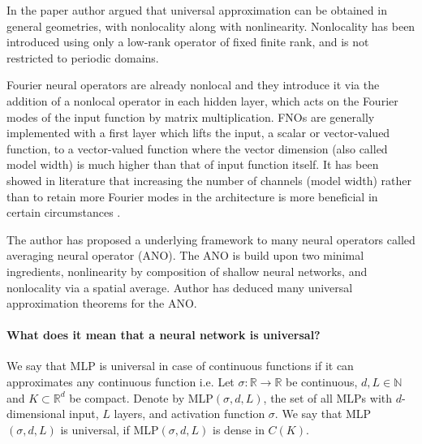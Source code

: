 \documentclass[reqno,9pt]{amsart}
\theoremstyle{plain}
\theoremstyle{definition}
\newcommand{\bb}[1]{\mathbb{#1}}
\begin{document}
\noindent In the paper author argued that universal approximation can be obtained in general geometries, with nonlocality along with nonlinearity. Nonlocality has been introduced using only a low-rank operator of fixed finite rank, and is not restricted to periodic domains.

\noindent Fourier neural operators are already nonlocal and they introduce it via the addition of a nonlocal operator in each hidden layer, which acts on the Fourier modes of the input function by matrix multiplication. FNOs are generally implemented with a first layer which lifts the input, a scalar or vector-valued function, to a vector-valued function where the vector dimension (also called model width) is much higher than that of input function itself. It has been showed in literature that increasing the number of channels (model width) rather than to retain more Fourier modes in the architecture is more beneficial in certain circumstances \cite{SL2022}.

\noindent The author has proposed a underlying framework to many neural operators called averaging neural operator (ANO). The ANO is build upon two minimal ingredients, nonlinearity by composition of shallow neural networks, and nonlocality via a spatial average. Author has deduced many universal approximation theorems for the ANO.

\paragraph{\bf What does it mean that a neural network is universal?} We say that MLP is universal in case of continuous functions if it can approximates any continuous function i.e. Let $\sigma:\bb R \to \bb R$ be continuous, $d,L \in \bb N$ and $K \subset \bb R^d$ be compact. Denote by MLP$(\sigma, d, L)$, the set of all MLPs with $d$- dimensional input, $L$ layers, and activation function $\sigma$. We say that MLP$(\sigma, d, L)$ is universal, if MLP$(\sigma, d,L)$ is dense in $C(K)$.
\end{document}
